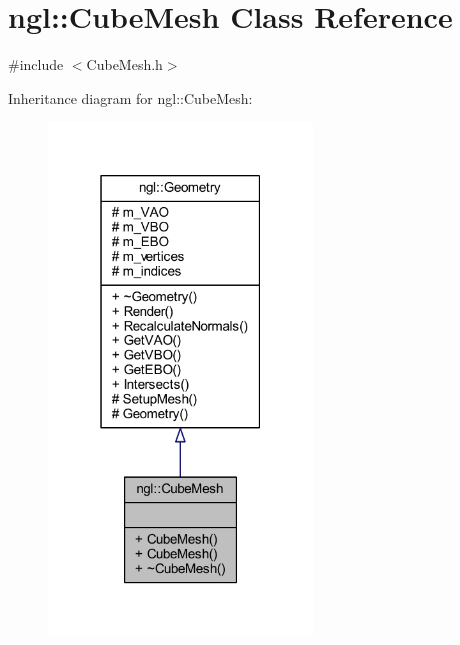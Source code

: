 \hypertarget{classngl_1_1_cube_mesh}{}\section{ngl\+:\+:Cube\+Mesh Class Reference}
\label{classngl_1_1_cube_mesh}


{\ttfamily \#include $<$Cube\+Mesh.\+h$>$}



Inheritance diagram for ngl\+:\+:Cube\+Mesh\+:
\nopagebreak
\begin{figure}[H]
\begin{center}
\leavevmode
\includegraphics[width=199pt]{classngl_1_1_cube_mesh__inherit__graph}
\end{center}
\end{figure}



